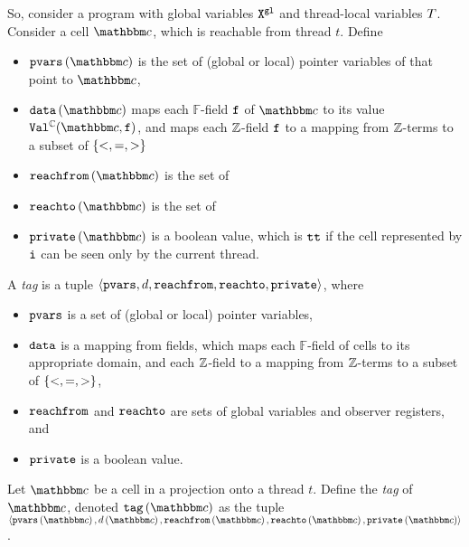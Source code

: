 So, consider a program with global variables ${\tt X}^{\tt gl}$ and thread-local variables $T$. Consider a cell $\cell$, which is reachable from thread $t$.
Define
\begin{itemize}
\item
  $\pvarsof{\cell}$ is the set of (global or local) pointer variables of that
  point to $\cell$,
\item
  $\valsof{\cell}$ maps each $\mathbb{F}$-field $\mathtt{f}$ of $\cell$ to its value
  $\cellval(\cell,\field)$, and maps each ${\mathbb Z}$-field $\mathtt{f}$ to
  a mapping from ${\mathbb Z}$-terms to a subset of $\left\{<, =, >\right\}$
\item
  $\reachfromof{\cell}$ is the set of
\item
  $\reachtoof{\cell}$ is the set of
\item
  $\privateof{\cell}$ is a boolean value, which is ${\tt tt}$ if
  the cell represented by $\tt i$ can be seen only by the current thread.
\end{itemize}
A {\em tag} is a tuple
$\left\langle\mathtt{pvars},d,\mathtt{reachfrom},\mathtt{reachto},\mathtt{private}\right\rangle$, where
\begin{itemize}
\item
  $\mathtt{pvars}$ is a set of (global or local) pointer variables,
\item
  $\mathtt{data}$ is a mapping from fields, which maps each $\mathbb{F}$-field of cells to its appropriate domain, and each ${\mathbb Z}$-field to a mapping from ${\mathbb Z}$-terms to a subset of $\left\{<, =, >\right\}$,
 \item
   $\mathtt{reachfrom}$ and $\mathtt{reachto}$ are sets of global variables and observer registers, and
  \item $\mathtt{private}$ is a boolean value.
\end{itemize}
Let $\cell$  be a cell in a projection onto a thread $t$. Define the {\em tag} of
$\cell$, denoted $\tagof{\cell}$ as the tuple $\tagtupleof{\cell}$.

